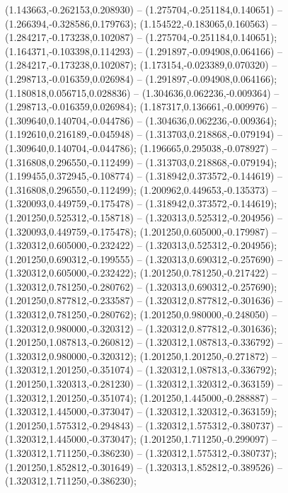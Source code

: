  (1.143663,-0.262153,0.208930) -- (1.275704,-0.251184,0.140651) -- (1.266394,-0.328586,0.179763);
 (1.154522,-0.183065,0.160563) -- (1.284217,-0.173238,0.102087) -- (1.275704,-0.251184,0.140651);
 (1.164371,-0.103398,0.114293) -- (1.291897,-0.094908,0.064166) -- (1.284217,-0.173238,0.102087);
 (1.173154,-0.023389,0.070320) -- (1.298713,-0.016359,0.026984) -- (1.291897,-0.094908,0.064166);
 (1.180818,0.056715,0.028836) -- (1.304636,0.062236,-0.009364) -- (1.298713,-0.016359,0.026984);
 (1.187317,0.136661,-0.009976) -- (1.309640,0.140704,-0.044786) -- (1.304636,0.062236,-0.009364);
 (1.192610,0.216189,-0.045948) -- (1.313703,0.218868,-0.079194) -- (1.309640,0.140704,-0.044786);
 (1.196665,0.295038,-0.078927) -- (1.316808,0.296550,-0.112499) -- (1.313703,0.218868,-0.079194);
 (1.199455,0.372945,-0.108774) -- (1.318942,0.373572,-0.144619) -- (1.316808,0.296550,-0.112499);
 (1.200962,0.449653,-0.135373) -- (1.320093,0.449759,-0.175478) -- (1.318942,0.373572,-0.144619);
 (1.201250,0.525312,-0.158718) -- (1.320313,0.525312,-0.204956) -- (1.320093,0.449759,-0.175478);
 (1.201250,0.605000,-0.179987) -- (1.320312,0.605000,-0.232422) -- (1.320313,0.525312,-0.204956);
 (1.201250,0.690312,-0.199555) -- (1.320313,0.690312,-0.257690) -- (1.320312,0.605000,-0.232422);
 (1.201250,0.781250,-0.217422) -- (1.320312,0.781250,-0.280762) -- (1.320313,0.690312,-0.257690);
 (1.201250,0.877812,-0.233587) -- (1.320312,0.877812,-0.301636) -- (1.320312,0.781250,-0.280762);
 (1.201250,0.980000,-0.248050) -- (1.320312,0.980000,-0.320312) -- (1.320312,0.877812,-0.301636);
 (1.201250,1.087813,-0.260812) -- (1.320312,1.087813,-0.336792) -- (1.320312,0.980000,-0.320312);
 (1.201250,1.201250,-0.271872) -- (1.320312,1.201250,-0.351074) -- (1.320312,1.087813,-0.336792);
 (1.201250,1.320313,-0.281230) -- (1.320312,1.320312,-0.363159) -- (1.320312,1.201250,-0.351074);
 (1.201250,1.445000,-0.288887) -- (1.320312,1.445000,-0.373047) -- (1.320312,1.320312,-0.363159);
 (1.201250,1.575312,-0.294843) -- (1.320312,1.575312,-0.380737) -- (1.320312,1.445000,-0.373047);
 (1.201250,1.711250,-0.299097) -- (1.320312,1.711250,-0.386230) -- (1.320312,1.575312,-0.380737);
 (1.201250,1.852812,-0.301649) -- (1.320313,1.852812,-0.389526) -- (1.320312,1.711250,-0.386230);
